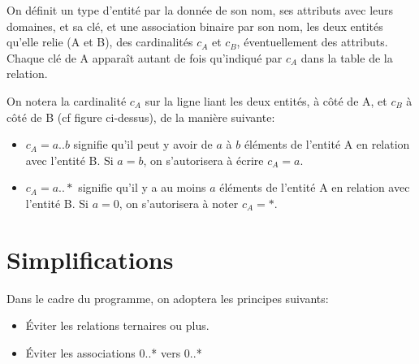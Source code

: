 \documentclass[a4paper]{scrartcl}
\begin{document}
		On définit un type d'entité par la donnée de son nom, ses attributs avec leurs domaines, et sa clé,
		et une association binaire par son nom, les deux entités qu'elle relie (A et B), des cardinalités $c_A$ et $c_B$, éventuellement des attributs.
		Chaque clé de A apparaît autant de fois qu'indiqué par $c_A$ dans la table de la relation. 

		On notera la cardinalité $c_A$ sur la ligne liant les deux entités, à côté de A, et $c_B$ à côté de B (cf figure ci-dessus),
		de la manière suivante:
		\begin{itemize}
			\item $c_A = a..b$ signifie qu'il peut y avoir de $a$ à $b$ éléments de l'entité A en relation avec l'entité B.
			Si $a=b$, on s'autorisera à écrire $c_A=a$.
			\item $c_A = a..*$ signifie qu'il y a au moins $a$ éléments de l'entité A en relation avec l'entité B.
			Si $a=0$, on s'autorisera à noter $c_A=*$.
		\end{itemize}
	\section{Simplifications}
		Dans le cadre du programme, on adoptera les principes suivants:
		\begin{itemize}
			\item Éviter les relations ternaires ou plus.
			\item Éviter les associations 0..* vers 0..*
		\end{itemize}
\end{document}
